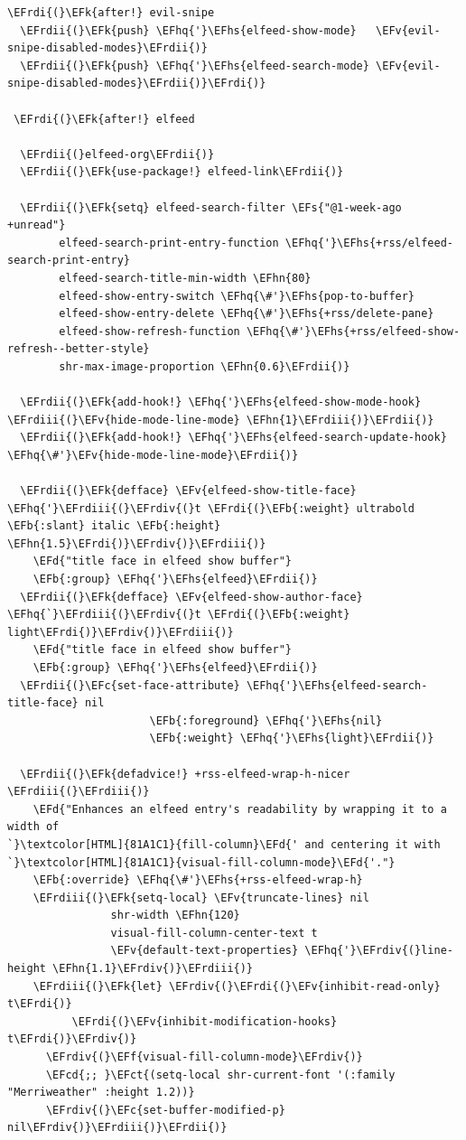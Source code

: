 \documentclass{scrartcl}
\newcommand{\EFk}[1]{\textcolor{EFk}{#1}} %
\newcommand{\EFd}[1]{\textcolor{EFd}{#1}} %
\newcommand{\EFs}[1]{\textcolor{EFs}{#1}} %
\newcommand{\EFb}[1]{\textcolor{EFb}{#1}} %
\newcommand{\EFct}[1]{\textcolor{EFct}{#1}} %
\newcommand{\EFc}[1]{\textcolor{EFc}{#1}} %
\newcommand{\EFv}[1]{\textcolor{EFv}{#1}} %
\newcommand{\EFf}[1]{\textcolor{EFf}{#1}} %
\newcommand{\EFcd}[1]{\textcolor{EFcd}{#1}} %
\newcommand{\EFhn}[1]{#1} %
\newcommand{\EFhq}[1]{#1} %
\newcommand{\EFhs}[1]{#1} %
\newcommand{\EFrdi}[1]{#1} %
\newcommand{\EFrdii}[1]{#1} %
\newcommand{\EFrdiii}[1]{#1} %
\newcommand{\EFrdiv}[1]{#1} %
\begin{document}
\begin{Code}
\begin{Verbatim}[]
\EFrdi{(}\EFk{after!} evil-snipe
  \EFrdii{(}\EFk{push} \EFhq{'}\EFhs{elfeed-show-mode}   \EFv{evil-snipe-disabled-modes}\EFrdii{)}
  \EFrdii{(}\EFk{push} \EFhq{'}\EFhs{elfeed-search-mode} \EFv{evil-snipe-disabled-modes}\EFrdii{)}\EFrdi{)}

 \EFrdi{(}\EFk{after!} elfeed

  \EFrdii{(}elfeed-org\EFrdii{)}
  \EFrdii{(}\EFk{use-package!} elfeed-link\EFrdii{)}

  \EFrdii{(}\EFk{setq} elfeed-search-filter \EFs{"@1-week-ago +unread"}
        elfeed-search-print-entry-function \EFhq{'}\EFhs{+rss/elfeed-search-print-entry}
        elfeed-search-title-min-width \EFhn{80}
        elfeed-show-entry-switch \EFhq{\#'}\EFhs{pop-to-buffer}
        elfeed-show-entry-delete \EFhq{\#'}\EFhs{+rss/delete-pane}
        elfeed-show-refresh-function \EFhq{\#'}\EFhs{+rss/elfeed-show-refresh--better-style}
        shr-max-image-proportion \EFhn{0.6}\EFrdii{)}

  \EFrdii{(}\EFk{add-hook!} \EFhq{'}\EFhs{elfeed-show-mode-hook} \EFrdiii{(}\EFv{hide-mode-line-mode} \EFhn{1}\EFrdiii{)}\EFrdii{)}
  \EFrdii{(}\EFk{add-hook!} \EFhq{'}\EFhs{elfeed-search-update-hook} \EFhq{\#'}\EFv{hide-mode-line-mode}\EFrdii{)}

  \EFrdii{(}\EFk{defface} \EFv{elfeed-show-title-face} \EFhq{'}\EFrdiii{(}\EFrdiv{(}t \EFrdi{(}\EFb{:weight} ultrabold \EFb{:slant} italic \EFb{:height} \EFhn{1.5}\EFrdi{)}\EFrdiv{)}\EFrdiii{)}
    \EFd{"title face in elfeed show buffer"}
    \EFb{:group} \EFhq{'}\EFhs{elfeed}\EFrdii{)}
  \EFrdii{(}\EFk{defface} \EFv{elfeed-show-author-face} \EFhq{`}\EFrdiii{(}\EFrdiv{(}t \EFrdi{(}\EFb{:weight} light\EFrdi{)}\EFrdiv{)}\EFrdiii{)}
    \EFd{"title face in elfeed show buffer"}
    \EFb{:group} \EFhq{'}\EFhs{elfeed}\EFrdii{)}
  \EFrdii{(}\EFc{set-face-attribute} \EFhq{'}\EFhs{elfeed-search-title-face} nil
                      \EFb{:foreground} \EFhq{'}\EFhs{nil}
                      \EFb{:weight} \EFhq{'}\EFhs{light}\EFrdii{)}

  \EFrdii{(}\EFk{defadvice!} +rss-elfeed-wrap-h-nicer \EFrdiii{(}\EFrdiii{)}
    \EFd{"Enhances an elfeed entry's readability by wrapping it to a width of
`}\textcolor[HTML]{81A1C1}{fill-column}\EFd{' and centering it with `}\textcolor[HTML]{81A1C1}{visual-fill-column-mode}\EFd{'."}
    \EFb{:override} \EFhq{\#'}\EFhs{+rss-elfeed-wrap-h}
    \EFrdiii{(}\EFk{setq-local} \EFv{truncate-lines} nil
                shr-width \EFhn{120}
                visual-fill-column-center-text t
                \EFv{default-text-properties} \EFhq{'}\EFrdiv{(}line-height \EFhn{1.1}\EFrdiv{)}\EFrdiii{)}
    \EFrdiii{(}\EFk{let} \EFrdiv{(}\EFrdi{(}\EFv{inhibit-read-only} t\EFrdi{)}
          \EFrdi{(}\EFv{inhibit-modification-hooks} t\EFrdi{)}\EFrdiv{)}
      \EFrdiv{(}\EFf{visual-fill-column-mode}\EFrdiv{)}
      \EFcd{;; }\EFct{(setq-local shr-current-font '(:family "Merriweather" :height 1.2))}
      \EFrdiv{(}\EFc{set-buffer-modified-p} nil\EFrdiv{)}\EFrdiii{)}\EFrdii{)}


\end{Verbatim}
\end{Code}
\end{document}
